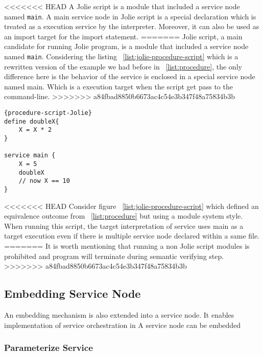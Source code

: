 <<<<<<< HEAD
A Jolie script is a module that included a service node named \texttt{main}. A main service node in Jolie script is a special declaration which is treated as a execution service by the interpreter. Moreover, it can also be used as an import target for the import statement.
=======
Jolie script, a main candidate for running Jolie program, is a module that included a service node named \texttt{main}. Considering the listing ~\ref{list:jolie-procedure-script} which is a rewritten version of the example we had before in ~\ref{list:procedure}, the only difference here is the behavior of the service is enclosed in a special service node named main. Which is a execution target when the script get pass to the command-line.
>>>>>>> a84fbad8850b6673ac4c54e3b347f48a75834b3b

\begin{listing}[h]
    \lstset{lan guage=Jolie,
        style=codeStyle
    }
\begin{lstlisting}[frame=tlrb, caption= {A Jolie script version of ~\ref{list:procedure}}, label={list:jolie-procedure-script}]{procedure-script-Jolie}
define doubleX{
    X = X * 2
}

service main {
    X = 5
    doubleX
    // now X == 10
}
\end{lstlisting}
\end{listing}

<<<<<<< HEAD
Consider figure ~\ref{list:jolie-procedure-script} which defined an equivalence outcome from ~\ref{list:procedure} but using a module system style. When running this script, the target interpretation of service uses main as a target execution even if there is multiple service node declared within a same file.
=======
It is worth mentioning that running a non Jolie script modules is prohibited and program will terminate during semantic verifying step.
>>>>>>> a84fbad8850b6673ac4c54e3b347f48a75834b3b

\subsection{Embedding Service Node}

An embedding mechanism is also extended into a service node. It enables implementation of service orchestration in 
A service node can be embedded 

\subsubsection{Parameterize Service}

